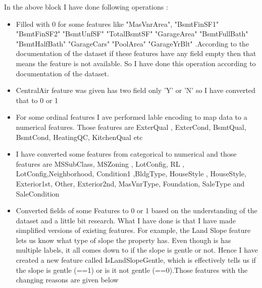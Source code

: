 \documentclass[11pt, a4paper , landscape]{article}
\begin{document}
    In the above block I have done following operations :

\begin{itemize}
\item
  Filled with 0 for some features like "MasVnrArea", "BsmtFinSF1"
  "BsmtFinSF2" "BsmtUnfSF" "TotalBsmtSF" "GarageArea" "BsmtFullBath"
  "BsmtHalfBath" "GarageCars" "PoolArea" "GarageYrBlt" .According to the
  documentation of the dataset if these features have any field empty
  then that means the feature is not available. So I have done this
  operation according to documentation of the dataset.
\item
  CentralAir feature was given has two field only 'Y' or 'N' so I have
  converted that to 0 or 1
\item
  For some ordinal features I ave performed lable encoding to map data
  to a numerical features. Those features are ExterQual , ExterCond,
  BsmtQual, BsmtCond, HeatingQC, KitchenQual etc
\item
  I have converted some features from categorical to numerical and those
  features are MSSubClass, MSZoning , LotConfig, RL ,
  LotConfig,Neighborhood, Condition1 ,BldgType, HouseStyle , HouseStyle,
  Exterior1st, Other, Exterior2nd, MasVnrType, Foundation, SaleType and
  SaleCondition
\item
  Converted fields of some Features to 0 or 1 based on the understanding
  of the dataset and a little bit research. What I have done is that I
  have made simplified versions of existing features. For example, the
  Land Slope feature lets us know what type of slope the property has.
  Even though is has multiple labels, it all comes down to if the slope
  is gentle or not. Hence I have created a new feature called
  IsLandSlopeGentle, which is effectively tells us if the slope is
  gentle (==1) or is it not gentle (==0).Those features with the
  changing reasons are given below


\end{itemize}
\end{document}
